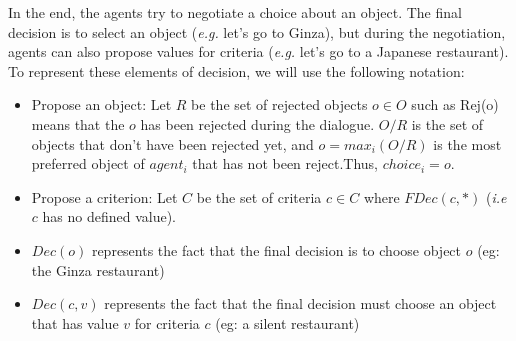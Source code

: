 \documentclass{llncs}
\begin{document}
 In the end, the agents try to negotiate a choice about an object. The final decision is to select an object (\emph{e.g.} let's go to Ginza), but during the negotiation, agents can also propose values for criteria (\emph{e.g.} let's go to a Japanese restaurant). To represent these elements of decision, we will use the following notation:
 \begin{itemize}
	 \item Propose an object: 
	 	\subitem Let  $R$  be the set of rejected objects $o\in O$ such as Rej(o) means that the $o$ has been rejected during the dialogue. 
	 	\subitem $O/R$ is the set of objects that don't have been rejected yet, and $o=max_i(O/R)$ is the most preferred object of $agent_i$ that has not been reject.Thus, $choice_i= o$.
	\item Propose a criterion:   
		\subitem Let $C$ be the set of criteria $c \in C$ where $FDec(c,*) $ (\textit{i.e} $c$ has no defined value). 
   \item $Dec(o)$ represents the fact that the final decision is to choose object $o$ (eg: the Ginza restaurant)
   \item $Dec(c,v)$ represents the fact that the final decision must choose an object that has value $v$ for criteria $c$ (eg: a silent restaurant)
 \end{itemize}
\end{document}
